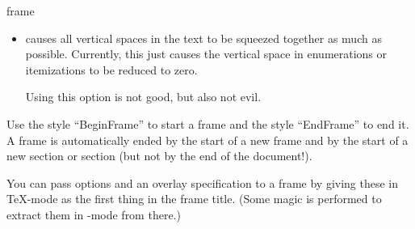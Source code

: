 \begin{environment}{{frame}%
    }
\begin{frame}[<+->][plain]
\begin{frame}[plain]
\begin{itemize}
    Since the shrinking takes place only after everything has been
    typeset, shrunken frame text will not fill the frame completely
    horizontally. For this reason, you can specify a  like |20|. If this percentage is specified, the
    frame will be shrunk by \emph{at least} by this percentage. Since
    \beamer\ knows this, it can increase the horizontal width
    proportionally such that the shrunken text once more fills the
    entire frame. If, however, the percentage is not enough, the text
    will be shrunken as needed and you will be punished with a warning
    message.

    The best way to use this option is to identify frames that are
    overly full, but in which all text absolutely has to be fit on a
    single frame. Then start specifying first |shrink=5|, then
    |shrink=10|, and so on, until no warning is issued any more (or
    just ignore the warning when things look satisfactory).

    Using this option is \emph{very evil}. It will
    result in changes of the font size from slide to slide, which is a
    typographic nightmare. Its usage can \emph{always} be avoided by
    restructuring and simplifying frames, which will result in a
    better presentation.

    \example
\begin{verbatim}
\begin{frame}[shrink=5]
  Some evil endless slide that is 5\% too large.
\end{frame}
\end{verbatim}
  \item
     causes all vertical spaces in the text to be
    squeezed together as much as possible. Currently, this just causes
    the vertical space in enumerations or itemizations to be reduced
    to zero.

    Using this option is not good, but also not evil.   
  \end{itemize}

  \lyxnote
  Use the style ``BeginFrame'' to start a frame and the style
  ``EndFrame'' to end it. A frame is automatically ended by the start
  of a new frame and by the start of a new section or section (but
  not by the end of the document!).

  \lyxnote
  You can pass options and an overlay specification to a frame by
  giving these in \TeX-mode as the first thing in the frame
  title. (Some magic is performed to extract them in \LyX-mode from
  there.)


\end{frame}
\end{frame}
\end{environment}
